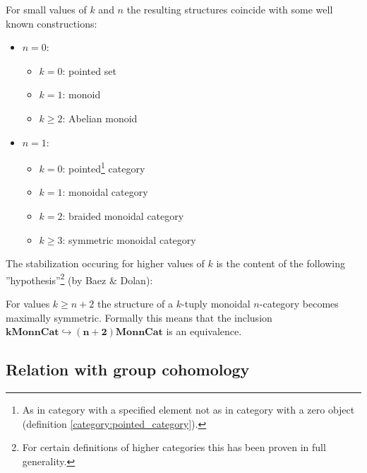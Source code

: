     \begin{example}
        For small values of $k$ and $n$ the resulting structures coincide with some well known constructions:
        \begin{itemize}
            \item $n=0$:
                \begin{itemize}
                    \item $k=0$: pointed set
                    \item $k=1$: monoid
                    \item $k\geq2$: Abelian monoid
                \end{itemize}
            \item $n=1$:
                \begin{itemize}
                    \item $k=0$: pointed\footnote{As in category with a specified element not as in category with a zero object (definition \ref{category:pointed_category}).} category
                    \item $k=1$: monoidal category
                    \item $k=2$: braided monoidal category
                    \item $k\geq3$: symmetric monoidal category
                \end{itemize}
        \end{itemize}
    \end{example}
    The stabilization occuring for higher values of $k$ is the content of the following ''hypothesis''\footnote{For certain definitions of higher categories this has been proven in full generality.} (by Baez \& Dolan):
    \begin{theorem}
        For values $k\geq n+2$ the structure of a $k$-tuply monoidal $n$-category becomes maximally symmetric. Formally this means that the inclusion \emph{$\boldsymbol{k}\mathbf{Mon}\boldsymbol{n}\mathbf{Cat}\hookrightarrow\boldsymbol{(n+2)}\mathbf{Mon}\boldsymbol{n}\mathbf{Cat}$} is an equivalence.
    \end{theorem}

\subsection[Relation to group cohomology]{Relation with group cohomology\footnotemark}

